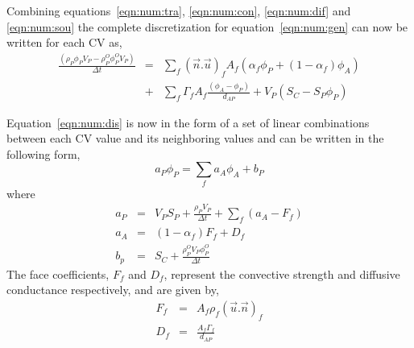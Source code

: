 Combining equations~\eqref{eqn:num:tra}, \eqref{eqn:num:con},
\eqref{eqn:num:dif} and \eqref{eqn:num:sou} the complete
discretization for equation~\eqref{eqn:num:gen} can now be written for
each CV as,
\begin{eqnarray}
\frac{(\rho_{P} \phi_{P} V_P- \rho_P^O \phi_P^O V_P)}{\Delta t}
&=&
\sum_{f} (\vec{n}.\vec{u})_f A_f (\alpha_f \phi_P +(1-\alpha_f)\phi_A)
\\
&+&
\sum_f \Gamma_f A_f \frac{(\phi_A-\phi_P)}{d_{AP}}
+ 
V_P ( S_C - S_P \phi_P )
\label{eqn:num:dis}
\end{eqnarray}

Equation~\eqref{eqn:num:dis} is now in the form of a set of linear
combinations between each CV value and its neighboring values and can be
written in the following form,
\begin{equation}
a_P \phi_P = \sum_f a_{A} \phi_{A} + b_P
\label{eqn:num:dap}
\end{equation}
where
\begin{eqnarray}
a_P & = & V_P S_P + \frac{\rho_P V_P}{\Delta t} + \sum_f (a_{A} - F_f) \\
a_{A} & = & ( 1 - \alpha_f ) F_f + D_f \\
b_p & = & S_C + \frac{\rho_P^O V_P \phi_P^O}{\Delta t} 
\end{eqnarray}
The face coefficients, $F_f$ and $D_f$, represent the convective strength
and diffusive conductance respectively, and are given by,
\begin{eqnarray}
F_f & = & A_f \rho_f ( \vec{u}.\vec{n} )_f \\
D_f & = & \frac{A_f \Gamma_f}{d_{AP}} 
\end{eqnarray}












